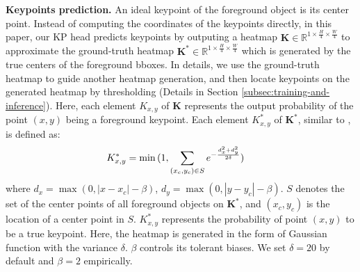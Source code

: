 \documentclass{article}
\begin{document}


\textbf{Keypoints prediction.}
\label{subsec:keypoints-prediction} 
An ideal keypoint of the foreground object is its center point. Instead of computing the coordinates of the keypoints directly, in this paper, our KP head predicts keypoints by outputing a heatmap $ \bm{K} \in \mathbb{R}^{1 \times \frac{H}{4} \times \frac{W}{4}}$ to approximate the ground-truth heatmap $ \bm{K}^{*} \in \mathbb{R}^{1 \times \frac{H}{4} \times \frac{W}{4}}$ which is generated by the true centers of the foreground bboxes. In details, we use the ground-truth heatmap to guide another heatmap generation, and then locate keypoints on the generated heatmap by thresholding (Details in Section \ref{subsec:training-and-inference}).
Here, each element $K_{x,y}$ of $\bm{K}$ represents the output probability of the point $(x,y)$ being a foreground keypoint. %
Each element $K^{*}_{x,y}$ of $ \bm{K}^*$, similar to \cite{duan2019centernet,cornernet}, is defined as:
\begin{align}
    \vspace{-5pt}
    K^*_{x,y} &= \min{(1, \sum_{(x_c,y_c) \in S}{e^{-\frac{d_x^2 + d_y^2}{2 \delta}}})}
    \vspace{-5pt}
\end{align}
\noindent where $d_x= \max{(0, |x - x_c|-\beta)}$, $d_y= \max{(0, |y - y_c|-\beta)}$. %
$S$ denotes the set of the center points of all foreground objects on $ \bm{K}^*$, and $(x_c, y_c)$ is the location of a center point in $S$. 
${K}^{*}_{x,y}$ represents  the probability of point $(x,y)$ to be a true keypoint. 
Here, the heatmap is generated in the form of Gaussian function with the variance $\delta$. $\beta$ controls its tolerant biases. We set $\delta=20$ by default and $\beta=2$ empirically. \par
\end{document}
